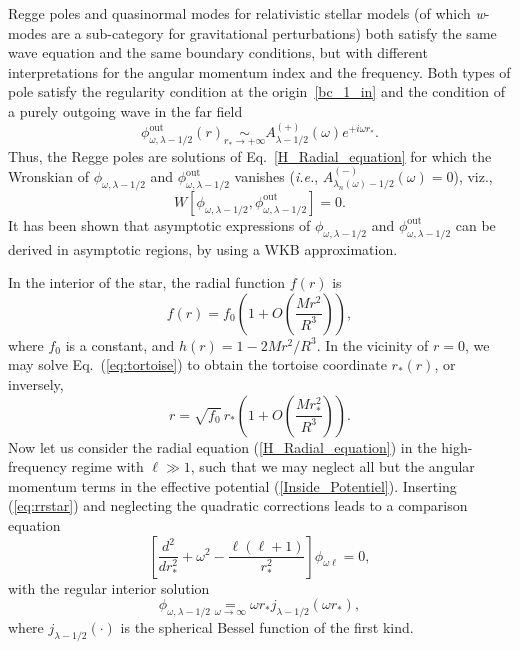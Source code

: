 \documentclass[aps,prd,longbibliography,reprint,twocolumn,amsmath,amssymb,amsfonts,showpacs,footnote,superscriptaddress]{revtex4-1}%
\newcommand{\phiout}{\phi^{\text{out}}_{\omega, \lambda-1/2}}
\newcommand{\phireg}{\phi^{}_{\omega, \lambda-1/2}}
\begin{document}
Regge poles and quasinormal modes for relativistic stellar models (of which \textit{w}-modes are a sub-category for gravitational perturbations) both satisfy the same wave equation and the same boundary conditions, but with different interpretations for the angular momentum index and the frequency. Both types of pole satisfy the regularity condition at the origin~\eqref{bc_1_in} and the condition of a purely outgoing wave in the far field
%
\begin{equation}\label{bc_pole_inf}
\phiout (r) \scriptstyle{\underset{r_\ast \to +\infty}{\sim}}
\displaystyle{  A^{(+)}_{\lambda-1/2} (\omega) e^{+i\omega r_\ast}}.
\end{equation}
%
Thus, the Regge poles are solutions of Eq.~\eqref{H_Radial_equation} for which the  Wronskian of $\phireg$ and $\phiout$ vanishes (\textit{i.e.}, $A^{(-)}_{\lambda_n(\omega)-1/2} (\omega)=0$), viz.,
\begin{equation}\label{Wronskian}
  W[\phireg, \phiout ]= 0 .
\end{equation}
It has been shown \cite{Zhang:2011pq} that asymptotic expressions of $\phireg$ and $\phiout$ can be derived in asymptotic regions, by using a WKB approximation. 

In the interior of the star, the radial function $f(r)$ is 
\begin{equation}
f(r) = f_0 \left(1 + O\left(\frac{M r^2}{R^3} \right) \right),
\end{equation}
where $f_0$ is a constant, and $h(r) = 1 - 2Mr^2/R^3$. In the vicinity of $r=0$, we may solve Eq.~(\ref{eq:tortoise}) to obtain the tortoise coordinate $r_\ast(r)$, or inversely,
\begin{equation}
r = \sqrt{f_0} \, r_\ast \left(1 + O\left(\frac{M r_\ast^2}{R^3} \right) \right) . \label{eq:rrstar}
\end{equation}
Now let us consider the radial equation (\ref{H_Radial_equation}) in the high-frequency regime with $\ell \gg 1$, such that we may neglect all but the angular momentum terms in the effective potential (\ref{Inside_Potentiel}). Inserting (\ref{eq:rrstar}) and neglecting the quadratic corrections leads to a comparison equation
\begin{equation}
\left[\frac{d^{2}}{dr_{\ast}^{2}}+\omega^{2} - \frac{\ell (\ell+1)}{r_\ast^2} \right] \phi_{\omega\ell}= 0,
\end{equation}
with the regular interior solution
\begin{equation}\label{Approx_origin}
  \phireg \underset{\omega \to \infty}{=} \omega r_* j_{\lambda-1/2} (\omega r_*),  
\end{equation}
where $j_{\lambda-1/2}(\cdot)$ is the spherical Bessel function of the first kind. 
\end{document}
